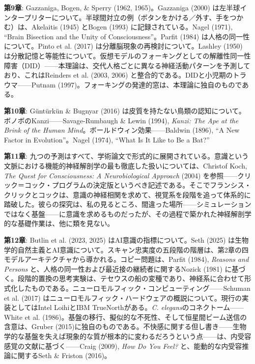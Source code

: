 \documentclass[11pt, twoside, openright]{book}
\begin{document}
\textbf{第9章}: Gazzaniga, Bogen, \& Sperry (1962, 1965)。Gazzaniga (2000) は左半球インタープリターについて。半球間対立の例（ボタンをかける／外す、手をつかむ）は、Akelaitis (1945) とBogen (1993) に記録されている。Nagel (1971), ``Brain Bisection and the Unity of Consciousness''。Parfit (1984) は人格の同一性について。Pinto et al. (2017) は分離脳現象の再検討について。Lashley (1950) は分散記憶と等能性について。仮想モデルのフォーキングとしての解離性同一性障害（DID）------本理論は、交代人格ごとに異なる神経活動パターンを予測しており、これはReinders et al. (2003, 2006) と整合的である。DIDと小児期のトラウマ------Putnam (1997)。フォーキングの発達的窓は、本理論に独自のものである。

\textbf{第10章}: Güntürkün \& Bugnyar (2016) は皮質を持たない鳥類の認知について。ボノボのKanzi------Savage-Rumbaugh \& Lewin (1994), \textit{Kanzi: The Ape at the Brink of the Human Mind}。ボールドウィン効果------Baldwin (1896), ``A New Factor in Evolution''。Nagel (1974), ``What Is It Like to Be a Bat?''

\textbf{第11章}: 九つの予測はすべて、学術論文で形式的に展開されている。意識という文脈における機能的神経解剖学の最も徹底した扱いについては、Christof Koch, \textit{The Quest for Consciousness: A Neurobiological Approach} (2004) を参照------クリック＝コック・プログラムの決定版というべき記述である。そこでフランシス・クリックとコックは、意識の神経相関を求めて、視覚系を段階を追って体系的に踏破した。彼らの探究は、私の見るところ、間違った場所------シミュレーションではなく基盤------に意識を求めるものだったが、その過程で築かれた神経解剖学的な基礎作業は、他に類を見ない。

\textbf{第12章}: Butlin et al. (2023, 2025) はAI意識の指標について。Seth (2025) は生物学的自然主義とAI意識について。スキャン忠実度の五段階の階層は、第2章の四モデルアーキテクチャから導かれる。コピー問題は、Parfit (1984), \textit{Reasons and Persons} と、人格の同一性および最近接の継続者に関するNozick (1981) に基づく。段階的置換の思考実験は、テセウスの船の変種であり、神経系に合わせて形式化したものである。ニューロモルフィック・コンピューティング------Schuman et al. (2017) はニューロモルフィック・ハードウェアの概説について。現行の実装としてはIntel LoihiとIBM TrueNorthがある。\textit{C. elegans}のコネクトーム------White et al. (1986)。基盤の移行、擬似的な不死性、そして恒星間ビーム送信の含意は、Gruber (2015)に独自のものである。不快感に関する但し書き------生物学的な基盤を失えば現象的な質が根本的に変わるだろうという点------は、内受容感覚の文献に基づく------Craig (2009), \textit{How Do You Feel?} と、能動的な内受容推論に関するSeth \& Friston (2016)。
\end{document}
